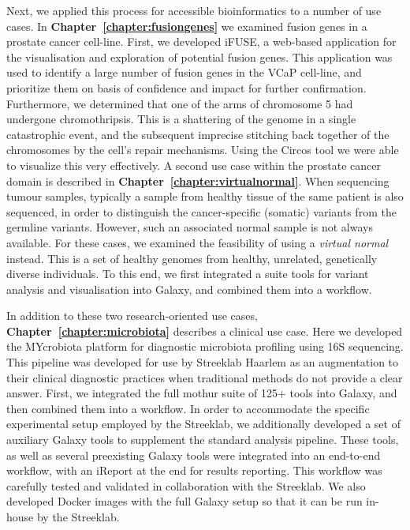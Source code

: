 Next, we applied this process for accessible bioinformatics to a number of use cases. In \textbf{Chapter~\ref{chapter:fusiongenes}} we examined fusion genes in a prostate cancer cell-line. First, we developed iFUSE, a web-based application for the visualisation and exploration of potential fusion genes. This application was used to identify a large number of fusion genes in the VCaP cell-line, and prioritize them on basis of confidence and impact for further confirmation. Furthermore, we determined that one of the arms of chromosome 5 had undergone chromothripsis. This is a shattering of the genome in a single catastrophic event, and the subsequent imprecise stitching back together of the chromosomes by the cell's repair mechanisms. Using the Circos tool we were able to visualize this very effectively.
A second use case within the prostate cancer domain is described in \textbf{Chapter~\ref{chapter:virtualnormal}}. When sequencing tumour samples, typically a sample from healthy tissue of the same patient is also sequenced, in order to distinguish the cancer-specific (somatic) variants from the germline variants. However, such an associated normal sample is not always available. For these cases, we examined the feasibility of using a \emph{virtual normal} instead. This is a set of healthy genomes from healthy, unrelated, genetically diverse individuals. To this end, we first integrated a suite tools for variant analysis and visualisation into Galaxy, and combined them into a workflow.

In addition to these two research-oriented use cases, \textbf{Chapter~\ref{chapter:microbiota}} describes a clinical use case. Here we developed the MYcrobiota platform for diagnostic microbiota profiling using 16S sequencing. This pipeline was developed for use by Streeklab Haarlem as an augmentation to their clinical diagnostic practices when traditional methods do not provide a clear answer.
First, we integrated the full mothur suite of 125+ tools into Galaxy, and then combined them into a workflow. In order to accommodate the specific experimental setup employed by the Streeklab, we additionally developed a set of auxiliary Galaxy tools to supplement the standard analysis pipeline.
These tools, as well as several preexisting Galaxy tools were integrated into an end-to-end workflow, with an iReport at the end for results reporting. This workflow was carefully tested and validated in collaboration with the Streeklab. We also developed Docker images with the full Galaxy setup so that it can be run in-house by the Streeklab.

